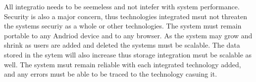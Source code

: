 \documentclass{article}
\begin{document}
All integratio needs to be seemeless and not intefer with system performance. Security is also a major concern, thus technologies integrated msut not threaten the systems securiy as a whole or other technologies. The system must remain portable to any Andriod device and to any browser. As the system may grow and shrink as users are added and deleted the systems must be scalable. The data stored in the sytem will also increase thus storage integration msut be scalable as well. The system msut remain reliable with each integrated technology added, and any errors must be able to be traced to the technology casuing it.  
\end{document}
